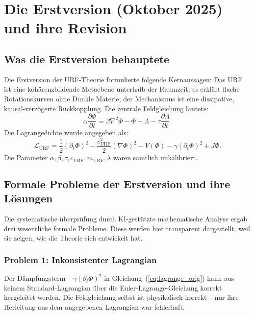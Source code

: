 \documentclass[12pt,a4paper]{article}
\theoremstyle{definition}
\begin{document}
\section{Die Erstversion (Oktober 2025) und ihre Revision}
\label{sec:erstversion}

\subsection{Was die Erstversion behauptete}

Die Erstversion der URF-Theorie \cite{Krämer2025} formulierte folgende
Kernaussagen: Das URF ist eine kohärenzbildende Metaebene unterhalb der
Raumzeit; es erklärt flache Rotationskurven ohne Dunkle Materie; der
Mechanismus ist eine dissipative, kausal-verzögerte Rückkopplung.
Die zentrale Feldgleichung lautete:
\begin{equation}
\alpha\frac{\partial\Phi}{\partial t} = \beta\nabla^2\Phi - \Phi + \Lambda
- \tau\frac{\partial\Lambda}{\partial t}.
\label{eq:feldgleichung_orig}
\end{equation}
Die Lagrangedichte wurde angegeben als:
\begin{equation}
\mathcal{L}_{\mathrm{URF}} = \frac{1}{2}(\partial_t\Phi)^2
- \frac{c_{\mathrm{URF}}^2}{2}(\nabla\Phi)^2 - V(\Phi)
- \gamma(\partial_t\Phi)^2 + J\Phi.
\label{eq:lagrange_orig}
\end{equation}
Die Parameter $\alpha, \beta, \tau, c_{\mathrm{URF}}, m_{\mathrm{URF}}, \lambda$
waren sämtlich unkalibriert.

\subsection{Formale Probleme der Erstversion und ihre Lösungen}

Die systematische überprüfung durch KI-gestützte mathematische Analyse
ergab drei wesentliche formale Probleme. Diese werden hier transparent
dargestellt, weil sie zeigen, wie die Theorie sich entwickelt hat.

\subsubsection{Problem 1: Inkonsistenter Lagrangian}

Der Dämpfungsterm $-\gamma(\partial_t\Phi)^2$ in
Gleichung~(\ref{eq:lagrange_orig}) kann aus keinem Standard-Lagrangian
über die Euler-Lagrange-Gleichung korrekt hergeleitet werden.
Die Feldgleichung selbst ist physikalisch korrekt -- nur ihre Herleitung
aus dem angegebenen Lagrangian war fehlerhaft.
\end{document}
